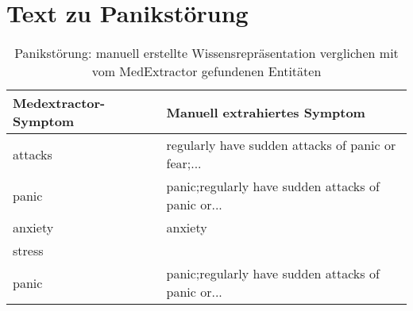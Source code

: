 \section{Text zu Panikstörung}
\label{sec:panicdisorder} 

\begin{table}[H]
\begin{center}
\begin{tabular}{ll}
\toprule
  Medextractor-Symptom &                       Manuell extrahiertes Symptom \\
\midrule
             attacks & regularly have sudden attacks of panic or fear;... \\
               panic & panic;regularly have sudden attacks of panic or... \\
             anxiety &                                            anxiety \\
              stress &                                                    \\
               panic & panic;regularly have sudden attacks of panic or... \\
\bottomrule
\end{tabular}
\caption{Panikstörung: manuell erstellte Wissensrepräsentation verglichen mit vom MedExtractor gefundenen Entitäten}
\label{tab:panicdisorder_vergleich_manuell_medextractor}
\end{center}
\end{table}


